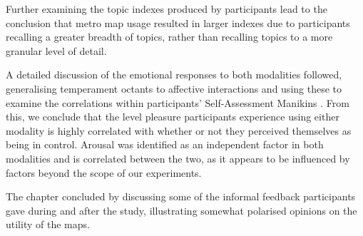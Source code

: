 Further examining the topic indexes produced by participants lead to the conclusion that metro map usage resulted in larger indexes due to participants recalling a greater breadth of topics, rather than recalling topics to a more granular level of detail.

A detailed discussion of the emotional responses to both modalities followed, generalising  temperament octants to affective interactions and using these to examine the correlations within participants' Self-Assessment Manikins \citep{measuringemotion}. From this, we conclude that the level pleasure participants experience using either modality is highly correlated with whether or not they perceived themselves as being in control. Arousal was identified as an independent factor in both modalities and is correlated between the two, as it appears to be influenced by factors beyond the scope of our experiments.

The chapter concluded by discussing some of the informal feedback participants gave during and after the study, illustrating somewhat polarised opinions on the utility of the maps.